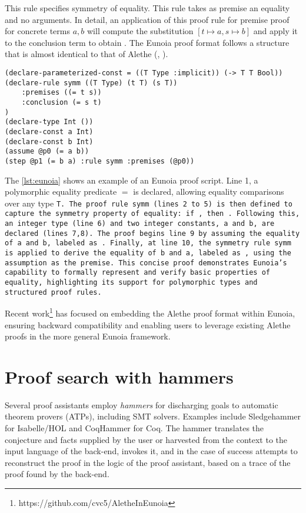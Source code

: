 This rule specifies symmetry of equality. This rule takes as premise an equality  and no arguments.
In detail, an application of this proof rule for premise proof  for concrete terms $a,b$ will compute the substitution $[t \mapsto a, s \mapsto b]$ and apply it to the conclusion term to obtain .
The Eunoia proof format follows a structure that is almost identical to that of Alethe (, ).

\begin{lstlisting}[language=Eunoia, caption={Eunoia proof example}, label={lst:eunoia}]
(declare-parameterized-const = ((T Type :implicit)) (-> T T Bool))
(declare-rule symm ((T Type) (t T) (s T))
    :premises ((= t s))
    :conclusion (= s t)
)
(declare-type Int ())
(declare-const a Int)
(declare-const b Int)
(assume @p0 (= a b))
(step @p1 (= b a) :rule symm :premises (@p0))
\end{lstlisting}

The \cref{lst:eunoia} shows an example of an Eunoia proof script. Line 1, a polymorphic equality predicate $=$ is declared, allowing equality comparisons over any type \tt{T}.
The proof rule \tt{symm} (lines 2 to 5) is then defined to capture the symmetry property of equality: if , then .
Following this, an integer type  (line 6) and two integer constants, \tt{a} and \tt{b}, are declared (lines 7,8).
The proof begins line 9 by assuming the equality of \tt{a} and \tt{b}, labeled as .
Finally, at line 10, the symmetry rule \tt{symm} is applied to derive the equality of \tt{b} and \tt{a}, labeled as , using the assumption  as the premise.
This concise proof demonstrates Eunoia's capability to formally represent and verify basic properties of equality, highlighting its support for polymorphic types and structured proof rules.

Recent work\footnote{https://github.com/cvc5/AletheInEunoia} has focused on embedding the Alethe proof format within Eunoia, ensuring backward compatibility and enabling users to leverage existing Alethe proofs in the more general Eunoia framework.

\section{Proof search with hammers}

Several proof assistants employ \emph{hammers} for discharging goals to automatic theorem provers (ATPs), including SMT solvers. Examples include Sledgehammer \cite{Sledgehammer} for Isabelle/HOL and CoqHammer \cite{coqhammer1,coqhammer2} for Coq.
The hammer translates the conjecture and facts supplied by the user or harvested
from the context to the input language of the back-end, invokes it, and in the
case of success attempts to reconstruct the proof in the logic of the proof
assistant, based on a trace of the proof found by the back-end.

